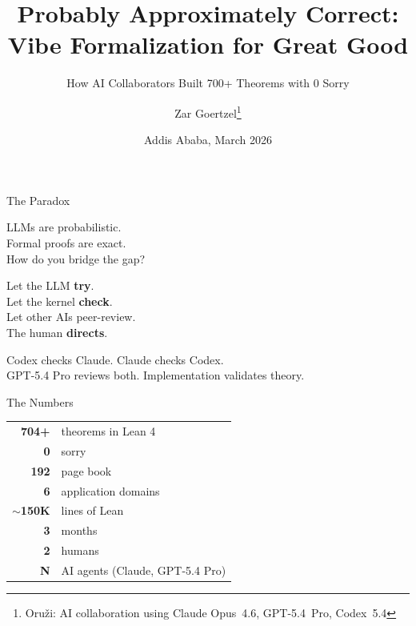 \documentclass[aspectratio=169,11pt]{beamer}
\title{Probably Approximately Correct:\\[4pt]
  Vibe Formalization for Great Good}
\subtitle{How AI Collaborators Built 700+ Theorems with 0 Sorry}
\author{Zar Goertzel\inst{1}\thanks{%
  Oru\v{z}i: AI collaboration using
  Claude Opus~4.6, GPT-5.4~Pro, Codex~5.4}}
\institute{Hyperon AGI Community Meeting}
\date{Addis Ababa, March 2026}
\begin{document}

\begin{frame}
\titlepage
\end{frame}

\begin{frame}{The Paradox}
\begin{center}
\Large
LLMs are \alert{probabilistic}.\\[6pt]
Formal proofs are \alert{exact}.\\[12pt]
\normalsize
How do you bridge the gap?
\end{center}

\bigskip
\begin{center}
Let the LLM \textbf{try}.\\
Let the kernel \textbf{check}.\\
Let \alert{other AIs peer-review}.\\
The human \textbf{directs}.
\end{center}

\medskip
Codex checks Claude. Claude checks Codex.\\
GPT-5.4 Pro reviews both. Implementation validates theory.
\end{frame}

\begin{frame}{The Numbers}
\begin{center}
\begin{tabular}{rl}
\textbf{704+} & theorems in Lean 4 \\
\textbf{0} & sorry \\
\textbf{192} & page book \\
\textbf{6} & application domains \\
\textbf{$\sim$150K} & lines of Lean \\
\textbf{3} & months \\
\textbf{2} & humans \\
\textbf{N} & AI agents (Claude, GPT-5.4 Pro) \\
\end{tabular}
\end{center}
\end{frame}
\end{document}
